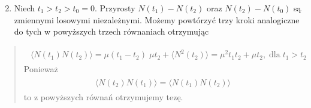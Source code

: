 \documentclass[a4paper,12pt,polish]{sphinxmanual}
\begin{document}
\begin{enumerate}
\setcounter{enumi}{1}
\item {} 
Niech $t_1 > t_2 > t_0=0$. Przyrosty $N(t_1) - N(t_2)$ oraz $N(t_2) - N(t_0)$ są zmiennymi losowymi niezależnymi. Możemy powtórzyć trzy kroki analogiczne do tych w powyższych trzech równaniach otrzymując

\end{enumerate}
\begin{quote}
\label{ch3/chIII021:equation-eqn39}\begin{gather}
\begin{split}\langle N(t_1) N(t_2)\rangle = \mu (t_1 -t_2) \; \mu t_2 + \langle N^2(t_2)\rangle = \mu^2 t_1 t_2 + \mu t_2,\; \mbox{dla} \; t_1 > t_2\end{split}\label{ch3/chIII021-eqn39}
\end{gather}
Ponieważ
\label{ch3/chIII021:equation-eqn40}\begin{gather}
\begin{split}\langle N(t_2) N(t_1)\rangle = \langle N(t_1) N(t_2)\rangle\end{split}\label{ch3/chIII021-eqn40}
\end{gather}
to z powyższych równań otrzymujemy tezę.
\end{quote}
\end{document}
